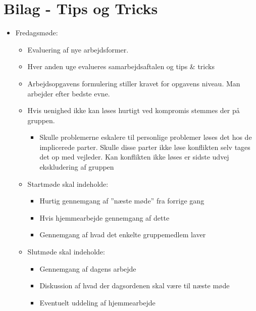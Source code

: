   \chapter{Bilag - Tips og Tricks}
  \label{Bilag2}
    

\begin{itemize}

      \item Fredagsmøde:
	
 	
 	
 	\begin{itemize}
 	    \item Evaluering af nye arbejdsformer. 
 	    \item Hver anden uge evalueres samarbejdsaftalen og tips \& tricks
 	    \item Arbejdsopgavens formulering stiller kravet for opgavens niveau. Man arbejder efter bedste evne.
 	    \item Hvis uenighed ikke kan løses hurtigt ved kompromis stemmes der på gruppen.
 	 \begin{itemize}
        \item Skulle problemerne eskalere til personlige problemer løses det hos de implicerede parter. Skulle disse parter ikke løse   konflikten selv tages det op med vejleder.
        Kan konflikten ikke løses er sidste udvej ekskludering af gruppen
    
    \end{itemize}  
       \item Startmøde skal indeholde:
    \begin{itemize}
    	\item Hurtig gennemgang af ”næste møde” fra forrige gang
    	\item Hvis hjemmearbejde gennemgang af dette 
    	\item Gennemgang af hvad det enkelte gruppemedlem laver
    	
    \end{itemize}   
 	    \item Slutmøde skal indeholde:
 	   
 	\begin{itemize}  
 	   \item Gennemgang af dagens arbejde 
 	   \item  Diskussion af hvad der dagsordenen skal være til næste møde
 	   \item Eventuelt uddeling af hjemmearbejde   
 	
   \end{itemize}
   

\end{itemize}
\end{itemize}
